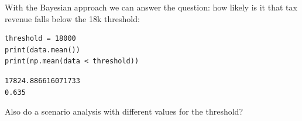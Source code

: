 \documentclass[11pt]{article}
\begin{document}
With the Bayesian approach we can answer the question: how likely is it that tax revenue falls below the 18k threshold:

\begin{verbatim}
threshold = 18000
print(data.mean())
print(np.mean(data < threshold))
\end{verbatim}

\label{}
\begin{verbatim}
17824.886616071733
0.635
\end{verbatim}



Also do a scenario analysis with different values for the threshold?
\end{document}
